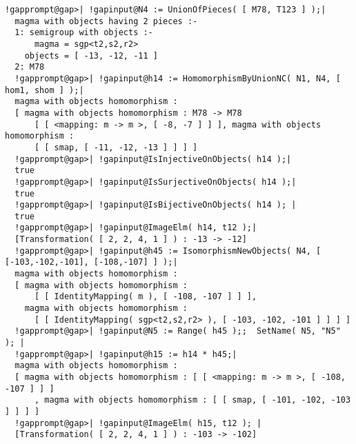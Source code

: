 \documentclass[a4paper,11pt]{report}
\begin{document}
{{\begin{Verbatim}[commandchars=!@|,fontsize=\small,frame=single,label=Example]
  !gapprompt@gap>| !gapinput@N4 := UnionOfPieces( [ M78, T123 ] );|
  magma with objects having 2 pieces :-
  1: semigroup with objects :-
      magma = sgp<t2,s2,r2>
    objects = [ -13, -12, -11 ]
  2: M78
  !gapprompt@gap>| !gapinput@h14 := HomomorphismByUnionNC( N1, N4, [ hom1, shom ] );|
  magma with objects homomorphism : 
  [ magma with objects homomorphism : M78 -> M78
      [ [ <mapping: m -> m >, [ -8, -7 ] ] ], magma with objects homomorphism : 
      [ [ smap, [ -11, -12, -13 ] ] ] ]
  !gapprompt@gap>| !gapinput@IsInjectiveOnObjects( h14 );|
  true
  !gapprompt@gap>| !gapinput@IsSurjectiveOnObjects( h14 );|
  true
  !gapprompt@gap>| !gapinput@IsBijectiveOnObjects( h14 ); |
  true
  !gapprompt@gap>| !gapinput@ImageElm( h14, t12 );|
  [Transformation( [ 2, 2, 4, 1 ] ) : -13 -> -12]
  !gapprompt@gap>| !gapinput@h45 := IsomorphismNewObjects( N4, [ [-103,-102,-101], [-108,-107] ] );|
  magma with objects homomorphism : 
  [ magma with objects homomorphism : 
      [ [ IdentityMapping( m ), [ -108, -107 ] ] ], 
    magma with objects homomorphism : 
      [ [ IdentityMapping( sgp<t2,s2,r2> ), [ -103, -102, -101 ] ] ] ]
  !gapprompt@gap>| !gapinput@N5 := Range( h45 );;  SetName( N5, "N5" ); |
  !gapprompt@gap>| !gapinput@h15 := h14 * h45;|
  magma with objects homomorphism : 
  [ magma with objects homomorphism : [ [ <mapping: m -> m >, [ -108, -107 ] ] ]
      , magma with objects homomorphism : [ [ smap, [ -101, -102, -103 ] ] ] ]
  !gapprompt@gap>| !gapinput@ImageElm( h15, t12 ); |
  [Transformation( [ 2, 2, 4, 1 ] ) : -103 -> -102]
  
\end{Verbatim}
 }

 }

            
\end{document}
